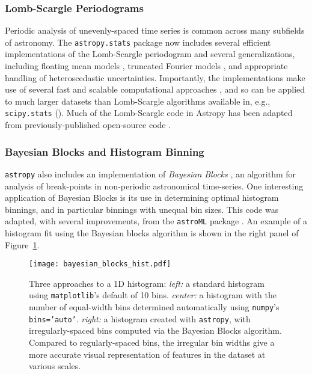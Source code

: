 \documentclass[modern]{aastex61}
\newcommand{\package}[1]{\texttt{#1}\xspace}
\newcommand{\astropy}{Astropy\xspace}
\newcommand{\astropypkg}{\package{astropy}}
\renewcommand{\figurename}{Figure\xspace}
\begin{document}
\subsubsection{Lomb-Scargle Periodograms}

Periodic analysis of unevenly-spaced time series is common across many subfields of astronomy. The \package{astropy.stats} package now includes several efficient implementations of the Lomb-Scargle periodogram \citep{Lomb76, Scargle82} and several generalizations, including floating mean models \citep{Zechmeister09}, truncated Fourier models \citep{Bretthorst2003}, and appropriate handling of heteroscedastic uncertainties. Importantly, the implementations make use of several fast and scalable computational approaches \citep[e.g.,][]{Press89, Palmer09}, and so can be applied to much larger datasets than Lomb-Scargle algorithms available in, e.g., \package{scipy.stats} (\citealt{scipy}). Much of the Lomb-Scargle code in \astropy has been adapted from previously-published open-source code \citep{astroML, VanderPlas2015}.

\subsubsection{Bayesian Blocks and Histogram Binning}
\astropypkg also includes an implementation of {\it Bayesian Blocks} \citep{Scargle2013}, an algorithm for analysis of break-points in non-periodic astronomical time-series. One interesting application of Bayesian Blocks is its use in determining optimal histogram binnings, and in particular binnings with unequal bin sizes. This code was adapted, with several improvements, from the \package{astroML} package \citep{astroML}. An example of a histogram fit using the Bayesian blocks algorithm is shown in the right panel of \figurename~\ref{fig:bayes-blocks-hist}.

\begin{figure}
\texttt{[image: bayesian\_blocks\_hist.pdf]}
\caption{%
    Three approaches to a 1D histogram:
    {\it left:} a standard histogram using \package{matplotlib}'s default of 10 bins.
    {\it center:} a histogram with the number of equal-width bins determined automatically using \package{numpy}'s {\tt bins='auto'}.
    {\it right:} a histogram created with \package{astropy}, with irregularly-spaced bins computed via the Bayesian Blocks algorithm.
    Compared to regularly-spaced bins, the irregular bin widths give a more accurate visual representation of features in the dataset at various scales.
    \label{fig:bayes-blocks-hist}
}
\end{figure}
\end{document}
